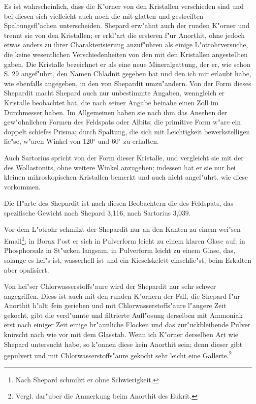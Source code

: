 \documentclass[a4paper, 11pt, oneside]{article}
\begin{document}
Es ist wahrscheinlich, dass die K"orner von den Kristallen verschieden sind und bei diesen sich vielleicht auch noch die mit glatten und gestreiften Spaltungsfl"achen unterscheiden. Shepard erw"ahnt auch der runden K"orner und trennt sie von den Kristallen; er erkl"art die ersteren f"ur Anorthit, ohne jedoch etwas anders zu ihrer Charakterisierung anzuf"uhren als einige L"otrohrversuche, die keine wesentlichen Verschiedenheiten von den mit den Kristallen angestellten gaben. Die Kristalle bezeichnet er als eine neue Mineralgattung, der er, wie schon S. 29 angef"uhrt, den Namen Chladnit gegeben hat und den ich mir erlaubt habe, wie ebenfalls angegeben, in den von Shepardit umzu"andern. Von der Form dieses Shepardit macht Shepard auch nur unbestimmte Angaben, wenngleich er Kristalle beobachtet hat, die nach seiner Angabe beinahe einen Zoll im Durchmesser haben. Im Allgemeinen haben sie nach ihm das Ansehen der gew"ohnlichen Formen des Feldspats oder Albits; die primitive Form w"are ein doppelt schiefes Prisma; durch Spaltung, die sich mit Leichtigkeit bewerkstelligen lie"se, w"aren Winkel von 120$^{\circ}$ und 60$^{\circ}$ zu erhalten.

Auch Sartorius spricht von der Form dieser Kristalle, und vergleicht sie mit der des Wollastonits, ohne weitere Winkel anzugeben; indessen hat er sie nur bei kleinen mikroskopischen Kristallen bemerkt und auch nicht angef"uhrt, wie diese vorkommen.

Die H"arte des Shepardit ist nach diesen Beobachtern die des Feldspats, das spezifische Gewicht nach Shepard 3,116, nach Sartorius 3,039.

Vor dem L"otrohr schmilzt der Shepardit nur an den Kanten zu einem wei"sen Email\footnote{Nach Shepard schmilzt er ohne Schwierigkeit.}; in Borax l"ost er sich in Pulverform leicht zu einem klaren Glase auf; in Phosphorsalz in St"ucken langsam, in Pulverform leicht zu einem Glase, das, solange es hei"s ist, wasserhell ist und ein Kieselskelett einschlie"st, beim Erkalten aber opalisiert.

Von hei"ser Chlorwasserstoffs"aure wird der Shepardit nur sehr schwer angegriffen. Diess ist auch mit den runden K"ornern der Fall, die Shepard f"ur Anorthit h"alt; fein gerieben und mit Chlorwasserstoffs"aure l"angere Zeit gekocht, gibt die verd"unnte und filtrierte Aufl"osung derselben mit Ammoniak erst nach einiger Zeit einige br"aunliche Flocken und das zur"uckbleibende Pulver knirscht nach wie vor mit dem Glasstab. Wenn ich K"orner derselben Art wie Shepard untersucht habe, so k"onnen diese kein Anorthit sein; denn dieser gibt gepulvert und mit Chlorwasserstoffs"aure gekocht sehr leicht eine Gallerte.\footnote{Vergl. dar"uber die Anmerkung beim Anorthit des Eukrit.}
\end{document}
